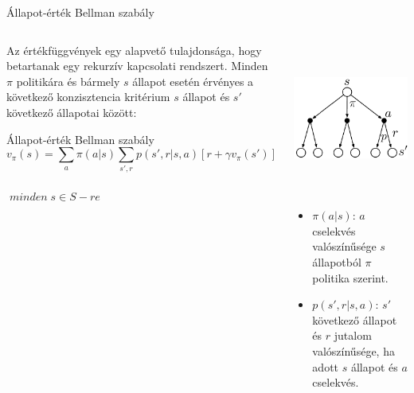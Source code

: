 \documentclass[english, aspectratio=169]{beamer}
\begin{document}
\begin{frame}{Állapot-érték Bellman szabály}
\begin{columns}
\begin{column}{.6\textwidth}
Az értékfüggvények egy alapvető tulajdonsága, hogy betartanak egy rekurzív kapcsolati rendszert. Minden $\pi$ politikára és bármely $s$ állapot esetén érvényes a következő konzisztencia kritérium $s$ állapot és $s'$ következő állapotai között:
\begin{block}{Állapot-érték Bellman szabály}
\[
v_{\pi}(s)=\sum_{a}\pi(a|s)\sum_{s',r}p\left(s',r|s,a\right)\left[r+\gamma v_{\pi}\left(s'\right)\right]
\]\\
$\;minden\;s\in S-re$
\end{block}
\end{column}
\begin{column}{.45\textwidth}
\begin{center}
\includegraphics[width=5cm, height=5cm, keepaspectratio]{images/reinf_11.png}
\end{center}
\begin{itemize}
	\item $\pi(a|s)$: $a$ cselekvés valószínűsége $s$ állapotból $\pi$ politika szerint.
	\item $p\left(s',r|s,a\right)$: $s'$ következő állapot és $r$ jutalom valószínűsége, ha adott $s$ állapot és $a$ cselekvés.
\end{itemize}
\end{column}
\end{columns}
\end{frame}
\end{document}
